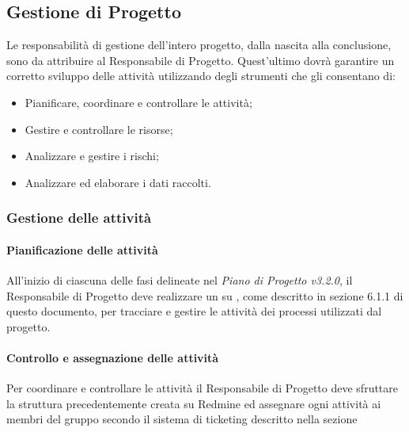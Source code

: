 \subsection{Gestione di Progetto}
Le responsabilità di gestione dell’intero progetto, dalla nascita alla conclusione, sono da
attribuire al Responsabile di Progetto.
Quest’ultimo dovrà garantire un corretto sviluppo delle attività utilizzando degli strumenti che gli consentano di:
\begin{itemize}
\item Pianificare, coordinare e controllare le attività;
\item Gestire e controllare le risorse;
\item Analizzare e gestire i rischi;
\item Analizzare ed elaborare i dati raccolti.
\end{itemize}

\label{}

\subsubsection{Gestione delle attività}
\label{}

\paragraph{Pianificazione delle attività}
\label{}
All'inizio di ciascuna delle fasi delineate nel \emph{Piano di Progetto v3.2.0}, il Responsabile di Progetto deve realizzare un  su , come descritto in sezione 6.1.1 di questo documento, per tracciare e gestire le attività dei processi utilizzati dal progetto.


\paragraph{Controllo e assegnazione delle attività}
Per coordinare e controllare le attività il Responsabile di Progetto deve sfruttare la struttura precedentemente creata su Redmine ed assegnare ogni attività ai membri del gruppo secondo il sistema di ticketing descritto nella sezione


